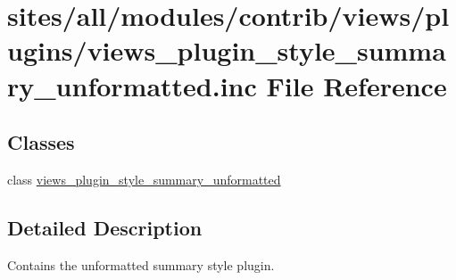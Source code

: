 \hypertarget{views__plugin__style__summary__unformatted_8inc}{
\section{sites/all/modules/contrib/views/plugins/views\_\-plugin\_\-style\_\-summary\_\-unformatted.inc File Reference}
\label{views__plugin__style__summary__unformatted_8inc}
}
\subsection*{Classes}
\begin{CompactItemize}
\item 
class \hyperlink{classviews__plugin__style__summary__unformatted}{views\_\-plugin\_\-style\_\-summary\_\-unformatted}
\end{CompactItemize}


\subsection{Detailed Description}
Contains the unformatted summary style plugin. 
